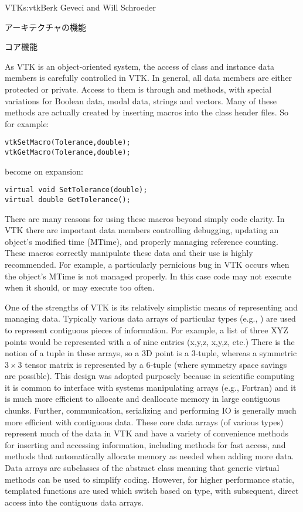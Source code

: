 \begin{aosachapter}{VTK}{s:vtk}{Berk Geveci and Will Schroeder}
\begin{aosasect1}{アーキテクチャの機能}
\begin{aosasect2}{コア機能}

As VTK is an object-oriented system, the access of class and instance
data members is carefully controlled in VTK\@. In general, all data
members are either protected or private. Access to them is through
 and  methods, with special variations for Boolean
data, modal data, strings and vectors. Many of these methods are
actually created by inserting macros into the class header files. So
for example:

\begin{verbatim}
vtkSetMacro(Tolerance,double);
vtkGetMacro(Tolerance,double);
\end{verbatim}

\noindent become on expansion:

\begin{verbatim}
virtual void SetTolerance(double);
virtual double GetTolerance();
\end{verbatim}

There are many reasons for using these macros beyond simply code
clarity. In VTK there are important data members controlling
debugging, updating an object's modified time (MTime), and properly
managing reference counting. These macros correctly manipulate these
data and their use is highly recommended. For example, a particularly
pernicious bug in VTK occurs when the object's MTime is not managed
properly. In this case code may not execute when it should, or may
execute too often.

One of the strengths of VTK is its relatively simplistic means of
representing and managing data. Typically various data arrays of
particular types (e.g., ) are used to represent
contiguous pieces of information. For example, a list of three XYZ
points would be represented with a  of nine
entries (x,y,z, x,y,z, etc.) There is the notion of a tuple in these
arrays, so a 3D point is a 3-tuple, whereas a symmetric $3{\times}3$
tensor matrix is represented by a 6-tuple (where symmetry space
savings are possible). This design was adopted purposely because in
scientific computing it is common to interface with systems
manipulating arrays (e.g., Fortran) and it is much more efficient to
allocate and deallocate memory in large contiguous chunks. Further,
communication, serializing and performing IO is generally much more
efficient with contiguous data. These core data arrays (of various
types) represent much of the data in VTK and have a variety of
convenience methods for inserting and accessing information, including
methods for fast access, and methods that automatically allocate
memory as needed when adding more data. Data arrays are subclasses of
the  abstract class meaning that generic virtual
methods can be used to simplify coding. However, for higher
performance static, templated functions are used which switch based on
type, with subsequent, direct access into the contiguous data arrays.


\end{aosasect2}
\end{aosasect1}
\end{aosachapter}
